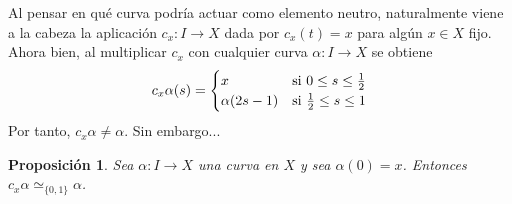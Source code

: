 \documentclass[11pt]{report}
\newenvironment{cproposition} %
  {\begin{mdframed}[innertopmargin = 0pt,
                    innerbottommargin = 7.5pt,
                    backgroundcolor = lightgray!10,
                    linewidth = 1pt,
                    shadow = true,
                    shadowsize = 5pt,
                    roundcorner = 0pt,
                    skipabove = 0pt]
    \begin{proposition}}
  {\end{proposition}\end{mdframed}}
\newtheorem{proposition}{Proposición}[chapter]
\theoremstyle{definition}
\theoremstyle{definition}
\theoremstyle{remark}
\begin{document}
Al pensar en qué curva podría actuar como elemento neutro, naturalmente viene a la cabeza la aplicación $c_x \colon I \to X$ dada por $c_x(t) = x$ para algún $x \in X$ fijo. Ahora bien, al multiplicar $c_x$ con cualquier curva $\alpha \colon I \to X$ se obtiene
\[c_x \alpha(s) = \begin{cases}
    x & $si$ \ 0 \leq s \leq \frac{1}{2} \\
    \alpha(2s-1) & $si$ \ \frac{1}{2} \leq s \leq 1
\end{cases}\]
Por tanto, $c_x \alpha \neq \alpha$. Sin embargo...

\hfill

\begin{cproposition}
\label{prop2.2.}
Sea $\alpha \colon I \to X$ una curva en $X$ y sea $\alpha(0) = x$. Entonces $c_x \alpha \simeq_{\{0,1\}} \alpha$.
\end{cproposition}
\end{document}
